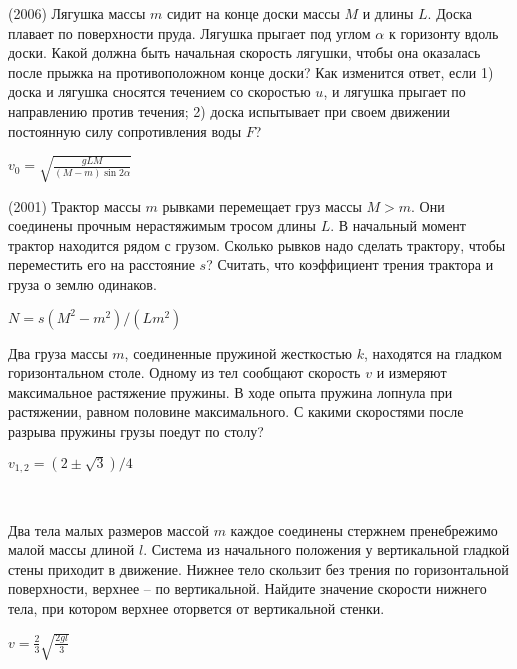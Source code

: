 \begin{ex}
(2006) Лягушка массы $m$ сидит на конце доски массы $M$ и длины $L$. Доска плавает по поверхности пруда. Лягушка прыгает под углом $\alpha$ к горизонту вдоль доски. Какой должна быть начальная скорость лягушки, чтобы она оказалась после прыжка на противоположном конце доски? Как изменится ответ, если 1) доска и лягушка сносятся течением со скоростью $u$, и лягушка прыгает по направлению против течения; 2) доска испытывает при своем движении постоянную силу сопротивления воды $F$?
\begin{ans}
$v_0 = \sqrt{\frac{gLM}{(M-m) \sin 2\alpha}}$
\end{ans}
\end{ex}

\begin{ex}
(2001) Трактор массы $m$ рывками перемещает груз массы $M>m$. Они соединены прочным нерастяжимым тросом длины $L$. В начальный момент трактор находится рядом с грузом. Сколько рывков надо сделать трактору, чтобы переместить его на расстояние $s$?  Считать, что коэффициент трения трактора и груза о землю одинаков.
\begin{ans}
$N = s(M^2-m^2)/(Lm^2)$
\end{ans}
\end{ex}

\begin{ex}
Два груза массы $m$, соединенные пружиной жесткостью $k$, находятся на гладком горизонтальном столе. Одному из тел сообщают скорость $v$ и измеряют максимальное растяжение пружины. В ходе опыта пружина лопнула при растяжении, равном половине максимального. С какими скоростями после разрыва пружины грузы поедут по столу?
\begin{ans}
$v_{1,2} = (2\pm \sqrt{3})/4$
\end{ans}
\end{ex}

\begin{ex}
\hspace{0pt} \\
\begin{minipage}{.65\textwidth}
Два тела малых размеров массой $m$ каждое соединены стержнем пренебрежимо малой массы длиной $l$. Система из начального положения у вертикальной гладкой стены приходит в движение. Нижнее тело скользит без трения по горизонтальной поверхности, верхнее -- по вертикальной. Найдите значение скорости нижнего тела, при котором верхнее оторвется от вертикальной стенки.
\end{minipage}
\begin{minipage}{.35\textwidth}
\centering

\end{minipage}
\begin{ans}
$v = \frac{2}{3}\sqrt{\frac{2gl}{3}}$
\end{ans}
\end{ex}

